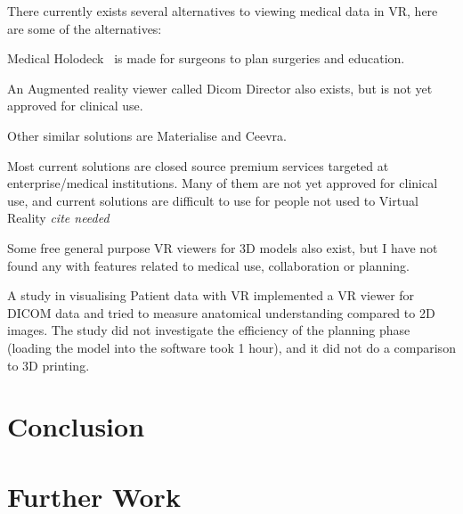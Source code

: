 \documentclass[a4paper]{report}
\begin{document}
There currently exists several alternatives to viewing medical data in VR, here are some of the alternatives:

Medical Holodeck~\cite{medical_holodeck_medicalholodeck_nodate} is made for surgeons to plan surgeries and education.

An Augmented reality viewer called Dicom Director also exists, but is not yet approved for clinical use.\cite{dicomdirectorcom_surgeons_nodate}

Other similar solutions are Materialise\cite{materialise_medical_nodate} and
Ceevra\cite{ceevra_inc_using_2019}.

Most current solutions are closed source premium services targeted at enterprise/medical institutions. Many of them are not yet approved for clinical use, and current solutions are difficult to use for people not used to Virtual Reality \emph{cite needed}

Some free general purpose VR viewers for 3D models also exist, but I have not found any with features related to medical use, collaboration or planning.

A study in visualising Patient data with VR \cite{vertemati_virtual_2019} implemented a VR viewer for DICOM data and tried to measure anatomical understanding compared to 2D images. The study did not investigate the efficiency of the planning phase (loading the model into the software took 1 hour), and it did not do a comparison to 3D printing.

\chapter{Conclusion} \label{Conclusion}

\chapter{Further Work} \label{Further Work}

\appendix



%
%
\printbibliography
\end{document}
